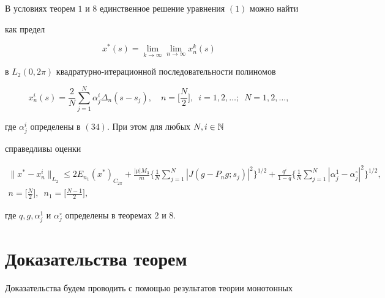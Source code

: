 \begin{thm}


В условиях теорем $1$ и $8$ единственное решение уравнения $(1)$ можно найти


как предел


$$


x^*(s)=\lim_{k\rightarrow\infty} \lim_{n\rightarrow\infty} x_n^k(s)


$$


в $L_2(0,2\pi)$ квадратурно-итерационной последовательности полиномов


$$


x_n^i(s)=\frac{2}{N}\sum_{j=1}^N\alpha_j^i \Delta_n(s-s_j),\quad


n=\pmb{\bigg [}\frac{N}{2}\pmb{\bigg ]},\ \;


i=1,2,\dotsc;\ \; N=1,2,\dotsc,


$$


где $\alpha_j^i$ определены в $(34)$. При этом для любых $N,i\in \Bbb N$


справедливы оценки


\begin{gather*}


\|x^*-x_n^i\|_{L_2}\leq 2 E_{n_1}(x^*)_{C_{2\pi}}+\frac{|\mu| M_3}{m}


\biggl\{\frac{1}{N}\sum_{j=1}^N|J(g-P_ng;s_j)|^2\biggr\}^{1/2}+


\frac{q^i}{1-q}\biggl\{\frac{1}{N}\sum_{j=1}^N|\alpha_j^1-


\alpha_j^\circ |^2\biggr\}^{1/2},\\


%


n=\pmb{\bigg [}\frac{N}{2}\pmb{\bigg ]},\ \;


n_1=\pmb{\bigg [}\frac{N-1}{2}\pmb{\bigg ]},


\end{gather*}


где $q,g,\alpha_j^1$ и $\alpha_j^\circ $ определены в теоремах $2$ и $8$.


\end{thm}





\section{Доказательства теорем}





Доказательства будем проводить с помощью результатов теории монотонных


